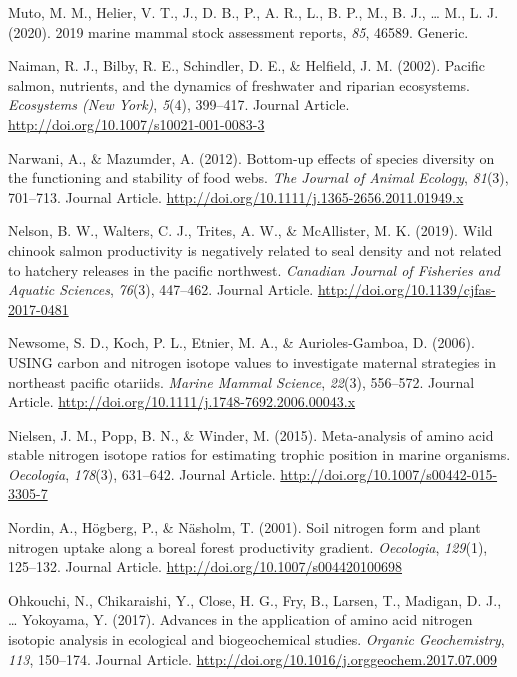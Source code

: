 \documentclass [11pt, proquest] {uwthesis}[2015/03/03]
\begin{document}
\hypertarget{ref-Muto2020}{}
Muto, M. M., Helier, V. T., J., D. B., P., A. R., L., B. P., M., B. J.,
\ldots{} M., L. J. (2020). 2019 marine mammal stock assessment reports,
\emph{85}, 46589. Generic.

\hypertarget{ref-Naiman2002}{}
Naiman, R. J., Bilby, R. E., Schindler, D. E., \& Helfield, J. M.
(2002). Pacific salmon, nutrients, and the dynamics of freshwater and
riparian ecosystems. \emph{Ecosystems (New York)}, \emph{5}(4),
399--417. Journal Article.
\url{http://doi.org/10.1007/s10021-001-0083-3}

\hypertarget{ref-Narwani2012}{}
Narwani, A., \& Mazumder, A. (2012). Bottom-up effects of species
diversity on the functioning and stability of food webs. \emph{The
Journal of Animal Ecology}, \emph{81}(3), 701--713. Journal Article.
\url{http://doi.org/10.1111/j.1365-2656.2011.01949.x}

\hypertarget{ref-Nelson2019}{}
Nelson, B. W., Walters, C. J., Trites, A. W., \& McAllister, M. K.
(2019). Wild chinook salmon productivity is negatively related to seal
density and not related to hatchery releases in the pacific northwest.
\emph{Canadian Journal of Fisheries and Aquatic Sciences}, \emph{76}(3),
447--462. Journal Article. \url{http://doi.org/10.1139/cjfas-2017-0481}

\hypertarget{ref-Newsome2006}{}
Newsome, S. D., Koch, P. L., Etnier, M. A., \& Aurioles-Gamboa, D.
(2006). USING carbon and nitrogen isotope values to investigate maternal
strategies in northeast pacific otariids. \emph{Marine Mammal Science},
\emph{22}(3), 556--572. Journal Article.
\url{http://doi.org/10.1111/j.1748-7692.2006.00043.x}

\hypertarget{ref-Nielsen2015}{}
Nielsen, J. M., Popp, B. N., \& Winder, M. (2015). Meta-analysis of
amino acid stable nitrogen isotope ratios for estimating trophic
position in marine organisms. \emph{Oecologia}, \emph{178}(3), 631--642.
Journal Article. \url{http://doi.org/10.1007/s00442-015-3305-7}

\hypertarget{ref-Nordin2001}{}
Nordin, A., Högberg, P., \& Näsholm, T. (2001). Soil nitrogen form and
plant nitrogen uptake along a boreal forest productivity gradient.
\emph{Oecologia}, \emph{129}(1), 125--132. Journal Article.
\url{http://doi.org/10.1007/s004420100698}

\hypertarget{ref-Ohkouchi2017}{}
Ohkouchi, N., Chikaraishi, Y., Close, H. G., Fry, B., Larsen, T.,
Madigan, D. J., \ldots{} Yokoyama, Y. (2017). Advances in the
application of amino acid nitrogen isotopic analysis in ecological and
biogeochemical studies. \emph{Organic Geochemistry}, \emph{113},
150--174. Journal Article.
\url{http://doi.org/10.1016/j.orggeochem.2017.07.009}
\end{document}
